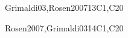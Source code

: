 \begin{syllabus}
 \begin{unit}{\DSSetsRelationsandFunctions}{}{Grimaldi03,Rosen2007}{13}{C1,C20}
   \begin{topics}
        \item \DSSetsRelationsandFunctionsTopicSets
        \item \DSSetsRelationsandFunctionsTopicRelations
        \item \DSSetsRelationsandFunctionsTopicFunctions
   \end{topics}
   \begin{learningoutcomes}
	\item \DSSetsRelationsandFunctionsLOExplainWith [\Assessment]
	\item \DSSetsRelationsandFunctionsLOPerformThe [\Assessment]
	\item \DSSetsRelationsandFunctionsLORelate [\Assessment]
   \end{learningoutcomes}
 \end{unit}

 \begin{unit}{\DSBasicLogic}{}{Rosen2007,Grimaldi03}{14}{C1,C20}
   \begin{topics}
        \item \DSBasicLogicTopicPropositional%
        \item \DSBasicLogicTopicLogical%
        \item \DSBasicLogicTopicTruth%
        \item \DSBasicLogicTopicNormal%
        \item \DSBasicLogicTopicValidity%
        \item \DSBasicLogicTopicPropositionalInference%
        \item \DSBasicLogicTopicPredicate%
        \item \DSBasicLogicTopicLimitations%
   \end{topics}
   \begin{learningoutcomes}
	\item \DSBasicLogicLOConvertLogical [\Usage ]
	\item \DSBasicLogicLOApplyFormal [\Usage ]
	\item \DSBasicLogicLOUseThe [\Usage]
	\item \DSBasicLogicLODescribeHowCan [\Familiarity]
	\item \DSBasicLogicLOApplyFormalAnd [\Usage ]
	\item \DSBasicLogicLODescribeTheLimitationsAnd [\Usage]
   \end{learningoutcomes}
 \end{unit}


\end{syllabus}
